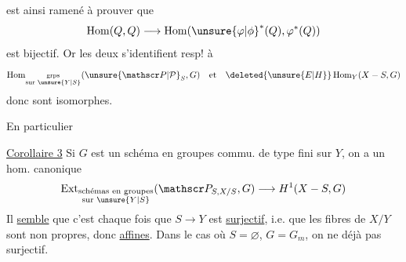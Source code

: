 est ainsi ramené à prouver que
\[
\operatorname{Hom}(Q,Q)\longrightarrow\operatorname{Hom}(\unsure{\varphi|\phi}^*(Q),\varphi^*(Q))
\]
est bijectif. Or les deux s’identifient resp! à
\[
\operatorname{Hom}_{\substack{\text{grps}\\\text{sur }\unsure{Y|S}}}(\unsure{\mathscr P|\mathcal P}_S,G)
\quad\text{et}\quad
\deleted{\unsure{E|H}}\operatorname{Hom}_Y(X-S,G)
\]
donc sont isomorphes.

En particulier

\uline{Corollaire 3} Si $G$ est un schéma en groupes commu. de type fini sur $Y$, on a un hom. canonique 
\[
\operatorname{Ext}_{\substack{\text{schémas en groupes}\\\text{sur }\unsure{Y|S}}}(\mathscr P_{S,X/S},G)\longrightarrow H^1(X-S,G)
\]
Il \uline{semble} que c’est \uline{} chaque fois que $S\longrightarrow Y$ est \uline{surjectif}, i.e. que les fibres de $X/Y$ sont non propres, donc \uline{affines}. Dans le cas où $S=\varnothing$, $G=G_m$, on ne  déjà pas surjectif.
